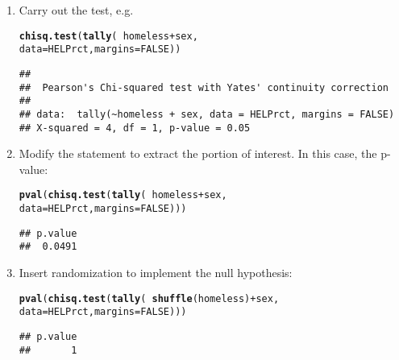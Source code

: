 \documentclass[11pt]{article}\usepackage[]{graphicx}\usepackage[]{color}
\makeatletter
\newcommand{\hlnum}[1]{\textcolor[rgb]{0.686,0.059,0.569}{#1}}%
\newcommand{\hlopt}[1]{\textcolor[rgb]{0,0,0}{#1}}%
\newcommand{\hlstd}[1]{\textcolor[rgb]{0.345,0.345,0.345}{#1}}%
\newcommand{\hlkwc}[1]{\textcolor[rgb]{0.333,0.667,0.333}{#1}}%
\newcommand{\hlkwd}[1]{\textcolor[rgb]{0.737,0.353,0.396}{\textbf{#1}}}%
\newenvironment{kframe}{%
 \def\at@end@of@kframe{}%
 \ifinner\ifhmode%
  \def\at@end@of@kframe{\end{minipage}}%
  \begin{minipage}{\columnwidth}%
 \fi\fi%
 \def\FrameCommand##1{\hskip\@totalleftmargin \hskip-\fboxsep
 \colorbox{shadecolor}{##1}\hskip-\fboxsep
     \hskip-\linewidth \hskip-\@totalleftmargin \hskip\columnwidth}%
 \MakeFramed {\advance\hsize-\width
   \@totalleftmargin\z@ \linewidth\hsize
   \@setminipage}}%
 {\par\unskip\endMakeFramed%
 \at@end@of@kframe}
\newenvironment{knitrout}{}{} %
\makeatother
\begin{document}
\begin{enumerate}
\item Carry out the test, e.g.
\begin{knitrout}
\color{fgcolor}\begin{kframe}
\begin{alltt}
\hlkwd{chisq.test}\hlstd{(}\hlkwd{tally}\hlstd{(}\hlopt{~} \hlstd{homeless} \hlopt{+} \hlstd{sex,}
                   \hlkwc{data} \hlstd{= HELPrct,} \hlkwc{margins} \hlstd{=} \hlnum{FALSE}\hlstd{))}
\end{alltt}
\begin{verbatim}
## 
## 	Pearson's Chi-squared test with Yates' continuity correction
## 
## data:  tally(~homeless + sex, data = HELPrct, margins = FALSE)
## X-squared = 4, df = 1, p-value = 0.05
\end{verbatim}
\end{kframe}
\end{knitrout}

\item Modify the statement to extract the portion of interest.  
In this case, the p-value:
\begin{knitrout}
\color{fgcolor}\begin{kframe}
\begin{alltt}
\hlkwd{pval}\hlstd{(}\hlkwd{chisq.test}\hlstd{(}\hlkwd{tally}\hlstd{(}\hlopt{~} \hlstd{homeless} \hlopt{+} \hlstd{sex,}
                   \hlkwc{data} \hlstd{= HELPrct,} \hlkwc{margins} \hlstd{=} \hlnum{FALSE}\hlstd{)) )}
\end{alltt}
\begin{verbatim}
## p.value 
##  0.0491
\end{verbatim}
\end{kframe}
\end{knitrout}

\item Insert randomization to implement the null hypothesis:
\begin{knitrout}
\color{fgcolor}\begin{kframe}
\begin{alltt}
\hlkwd{pval}\hlstd{(}\hlkwd{chisq.test}\hlstd{(}\hlkwd{tally}\hlstd{(}\hlopt{~} \hlkwd{shuffle}\hlstd{(homeless)} \hlopt{+} \hlstd{sex,}
                         \hlkwc{data} \hlstd{= HELPrct,} \hlkwc{margins} \hlstd{=} \hlnum{FALSE}\hlstd{)))}
\end{alltt}
\begin{verbatim}
## p.value 
##       1
\end{verbatim}
\end{kframe}
\end{knitrout}


\end{enumerate}
\end{document}
